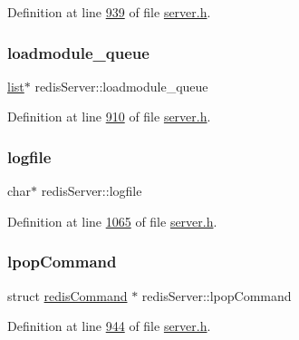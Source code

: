 Definition at line \hyperlink{server_8h_source_l00939}{939} of file \hyperlink{server_8h_source}{server.\+h}.

\mbox{\label{structredisServer_aebbda08fd09a9d8bb345a20f4d9ba3fa}} 
\subsubsection{\texorpdfstring{loadmodule\+\_\+queue}{loadmodule\_queue}}
{\footnotesize\ttfamily \hyperlink{structlist}{list}$\ast$ redis\+Server\+::loadmodule\+\_\+queue}



Definition at line \hyperlink{server_8h_source_l00910}{910} of file \hyperlink{server_8h_source}{server.\+h}.

\mbox{\label{structredisServer_acdbfc33ef589cd01f5f1c4eea0d9e705}} 
\subsubsection{\texorpdfstring{logfile}{logfile}}
{\footnotesize\ttfamily char$\ast$ redis\+Server\+::logfile}



Definition at line \hyperlink{server_8h_source_l01065}{1065} of file \hyperlink{server_8h_source}{server.\+h}.

\mbox{\label{structredisServer_abaf764c411a461a198ae507a7d530ebb}} 
\subsubsection{\texorpdfstring{lpop\+Command}{lpopCommand}}
{\footnotesize\ttfamily struct \hyperlink{structredisCommand}{redis\+Command} $\ast$ redis\+Server\+::lpop\+Command}



Definition at line \hyperlink{server_8h_source_l00944}{944} of file \hyperlink{server_8h_source}{server.\+h}.

